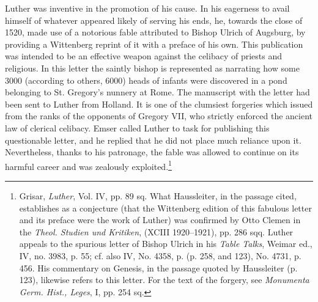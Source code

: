 Luther was inventive in the promotion of his cause. In his eagerness
to avail himself of whatever appeared likely of serving his ends,
he, towards the close of 1520, made use of a notorious fable attributed
to Bishop Ulrich of Augsburg, by providing a Wittenberg reprint
of it with a preface of his own. This publication was intended
to be an effective weapon against the celibacy of priests and religious.
In this letter the saintly bishop is represented as narrating how some
3000 (according to others, 6000) heads of infants were discovered in
a pond belonging to St. Gregory’s nunnery at Rome. The manuscript with
the letter had been sent to Luther from Holland. It is
one of the clumsiest forgeries which issued from the ranks of the opponents
of Gregory VII, who strictly enforced the ancient law of
clerical celibacy. Emser called Luther to task for publishing this questionable
letter, and he replied that he did not place much reliance
upon it. Nevertheless, thanks to his patronage, the fable was allowed
to continue on its harmful career and was zealously exploited.\footnote
{Grisar, \textit{Luther}, Vol. IV, pp. 89 sq. What Haussleiter, in the passage cited, establishes
as a conjecture (that the Wittenberg edition of this fabulous letter and its preface were
the work of Luther) was confirmed by Otto Clemen in the \textit{Theol. Studien und Kritiken},
(XCIII 1920--1921), pp. 286 sqq. Luther appeals to the spurious letter of Bishop Ulrich
in his \textit{Table Talks}, Weimar ed., IV, no. 3983, p. 55; cf. also IV, No. 4358, p. (p. 258, and 123),
No. 4731, p. 456. His commentary on Genesis, in the passage quoted by Haussleiter (p. 123),
likewise refers to this letter. For the text of the forgery, see \textit{Monumenta Germ. Hist.,
Leges}, I, pp. 254 sq.}

